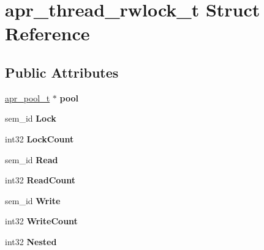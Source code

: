 \hypertarget{structapr__thread__rwlock__t}{}\section{apr\+\_\+thread\+\_\+rwlock\+\_\+t Struct Reference}
\label{structapr__thread__rwlock__t}
\subsection*{Public Attributes}
\begin{DoxyCompactItemize}
\item 
\mbox{\label{structapr__thread__rwlock__t_a20241ee40d7423d9ae3c1cfa74a4b6c8}} 
\mbox{\hyperlink{group__apr__pools_gaf137f28edcf9a086cd6bc36c20d7cdfb}{apr\+\_\+pool\+\_\+t}} $\ast$ {\bfseries pool}
\item 
\mbox{\label{structapr__thread__rwlock__t_a1d408f47a24f3c6400a81dd3fbbf148a}} 
sem\+\_\+id {\bfseries Lock}
\item 
\mbox{\label{structapr__thread__rwlock__t_a4cccf3fe3dfcd05f17c23db816ed83a0}} 
int32 {\bfseries Lock\+Count}
\item 
\mbox{\label{structapr__thread__rwlock__t_a3c8fbeb2cdf01195b7e467b513215527}} 
sem\+\_\+id {\bfseries Read}
\item 
\mbox{\label{structapr__thread__rwlock__t_a16110f05f23434db18b7dcf8eb8fb825}} 
int32 {\bfseries Read\+Count}
\item 
\mbox{\label{structapr__thread__rwlock__t_a6acf442957f11834589a86ca9129e9f0}} 
sem\+\_\+id {\bfseries Write}
\item 
\mbox{\label{structapr__thread__rwlock__t_a567cae2d82641fa7e7c88ba91d0797fc}} 
int32 {\bfseries Write\+Count}
\item 
\mbox{\label{structapr__thread__rwlock__t_a53bc9d37e43ab5eafcd7b2253e29724d}} 
int32 {\bfseries Nested}
\item 

\end{DoxyCompactItemize}
